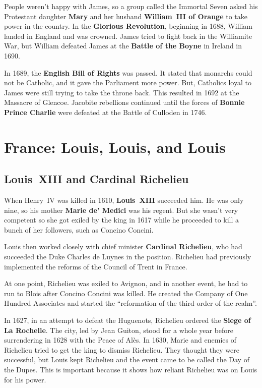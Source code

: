 People weren't happy with James,
so a group called the Immortal Seven asked his Protestant daughter
\textbf{Mary} and her husband \textbf{William~III of Orange} to take power in the country.
In the \textbf{Glorious Revolution}, beginning in 1688, William landed in England and was crowned.
James tried to fight back in the Williamite War,
but William defeated James at the \textbf{Battle of the Boyne} in Ireland in 1690.

In 1689, the \textbf{English Bill of Rights} was passed.
It stated that monarchs could not be Catholic, and it gave the Parliament more power.
But, Catholics loyal to James were still trying to take the throne back.
This resulted in 1692 at the Massacre of Glencoe.
Jacobite rebellions continued until the forces of
\textbf{Bonnie Prince Charlie} were defeated at the Battle of Culloden in 1746.

\section{France: Louis, Louis, and Louis}

\subsection*{Louis~XIII and Cardinal Richelieu}

When Henry~IV was killed in 1610, \textbf{Louis~XIII} succeeded him.
He was only nine, so his mother \textbf{Marie de' Medici} was his regent.
But she wasn't very competent so she got exiled by the king in 1617
while he proceeded to kill a bunch of her followers, such as Concino Concini.

Louis then worked closely with chief minister \textbf{Cardinal Richelieu},
who had succeeded the Duke Charles de Luynes in the position.
Richelieu had previously implemented the reforms of the Council of Trent in France.

At one point, Richelieu was exiled to Avignon,
and in another event, he had to run to Blois after Concino Concini was killed.
He created the Company of One Hundred Associates
and started the ``reformation of the third order of the realm''.

In 1627, in an attempt to defeat the Huguenots, Richelieu ordered the \textbf{Siege of La Rochelle}.
The city, led by Jean Guiton,
stood for a whole year before surrendering in 1628 with the Peace of Al\`es.
In 1630, Marie and enemies of Richelieu tried to get the king to dismiss Richelieu.
They thought they were successful,
but Louis kept Richelieu and the event came to be called the Day of the Dupes.
This is important because it shows how reliant Richelieu was on Louis for his power.

